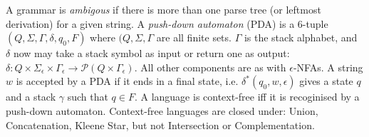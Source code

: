  A grammar is \textit{ambigous} if there is more than one parse tree (or leftmost derivation) for a given string.
 A \textit{push-down automaton} (PDA) is a 6-tuple $(Q, \Sigma, \Gamma, \delta, q_0, F)$ where $(Q, \Sigma, \Gamma$ are all finite sets. $\Gamma$ is the stack alphabet, and $\delta$ now may take a stack symbol as input or return one as output: $\delta: Q \times \Sigma_\epsilon \times \Gamma_\epsilon \to \mathcal{P}(Q \times \Gamma_\epsilon)$. All other components are as with $\epsilon$-NFAs.
 A string $w$ is accepted by a PDA if it ends in a final state, i.e. $\delta^*(q_0, w, \epsilon)$ gives a state $q$ and a stack $\gamma$ such that $q \in F$.
 A language is context-free iff it is recoginised by a push-down automaton.
 Context-free languages are closed under: Union, Concatenation, Kleene Star, but not Intersection or Complementation.
